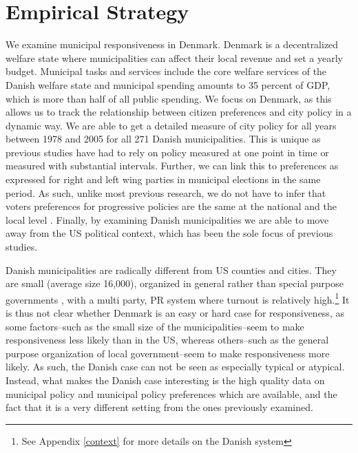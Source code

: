 \documentclass[a4paper,12pt]{article}
\begin{document}
\section*{Empirical Strategy}

 We examine municipal responsiveness in Denmark. Denmark is a decentralized welfare state where municipalities can affect their local revenue and set a yearly budget.  Municipal tasks and services include the core welfare services of the Danish welfare state and municipal spending amounts to 35 percent of GDP, which is more than half of all public spending. We focus on Denmark, as this allows us to track the relationship between citizen preferences and city policy in a dynamic way. We are able to get a detailed measure of city policy for all years between 1978 and 2005 for all 271 Danish municipalities. This is unique as previous studies have had to rely on policy measured at one point in time \citep{tausanovitch2014representation,palus2010responsiveness} or measured with substantial intervals\citep{sances2017voters,einstein2016pushing,hajnal2010or}. Further, we can link this to preferences as expressed for right and left wing parties in municipal elections in the same period. As such, unlike most previous research, we do not have to infer that voters preferences for progressive policies are the same at the national and the local level \citep[for an exception, see][]{tausanovitch2014representation}. Finally, by examining Danish municipalities we are able to move away from the US political context, which has been the sole focus of previous studies. 
 
Danish municipalities are radically different from US counties and cities. They are small (average size 16,000), organized in general rather than special purpose governments \citep{berry2009imperfect}, with a multi party, PR system where turnout is relatively high.\footnote{See Appendix \ref{context} for more details on the Danish system} It is thus not clear whether Denmark is an easy or hard case for responsiveness, as some factors--such as the small size of the municipalities--seem to make responsiveness less likely than in the US, whereas others--such as the general purpose organization of local government--seem to make responsiveness more likely. As such, the Danish case can not be seen as especially typical or atypical. Instead, what makes the Danish case interesting is the high quality data on municipal policy and municipal policy preferences which are available, and the fact that it is a very different setting from the ones previously examined.
\end{document}

